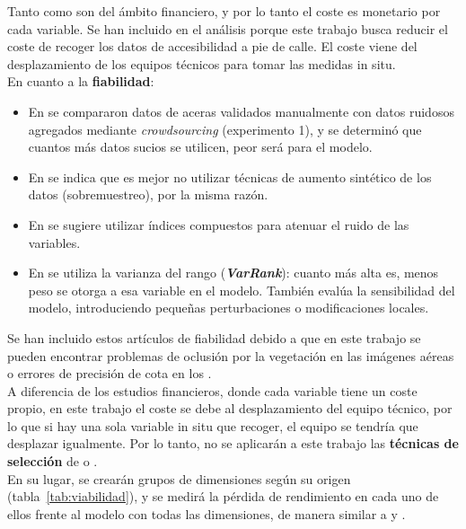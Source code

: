 Tanto \textcite{chen2024cost} como \textcite{liu2024haff} son del ámbito financiero, y por lo tanto el coste es monetario por cada variable. Se han incluido en el análisis porque este trabajo busca reducir el coste de recoger los datos de accesibilidad a pie de calle. El coste viene del desplazamiento de los equipos técnicos para tomar las medidas in situ.
\\

\noindent En cuanto a la \textbf{fiabilidad}:
\begin{itemize}
  \item En \textcite{duan2022} se compararon datos de aceras validados manualmente con datos ruidosos agregados mediante \textit{crowdsourcing} (experimento 1), y se determinó que cuantos más datos sucios se utilicen, peor será para el modelo.
  \item En \textcite{wang2026} se indica que es mejor no utilizar técnicas de aumento sintético de los datos (sobremuestreo), por la misma razón.
  \item En \textcite{agal2026} se sugiere utilizar índices compuestos para atenuar el ruido de las variables.
  \item En \textcite{knights2026} se utiliza la varianza del rango (\textbf{\textit{VarRank}}): cuanto más alta es, menos peso se otorga a esa variable en el modelo. También evalúa la sensibilidad del modelo, introduciendo pequeñas perturbaciones o modificaciones locales.
\end{itemize}

Se han incluido estos artículos de fiabilidad debido a que en este trabajo se pueden encontrar problemas de oclusión por la vegetación en las imágenes aéreas o errores de precisión de cota en los .
\\

A diferencia de los estudios financieros, donde cada variable tiene un coste propio, en este trabajo el coste se debe al desplazamiento del equipo técnico, por lo que si hay una sola variable in situ que recoger, el equipo se tendría que desplazar igualmente. Por lo tanto, no se aplicarán a este trabajo las \textbf{técnicas de selección} de \textcite{chen2024cost} o \textcite{liu2024haff}.
\\

En su lugar, se crearán grupos de dimensiones según su origen (tabla~\ref{tab:viabilidad}), y se medirá la pérdida de rendimiento en cada uno de ellos frente al modelo con todas las dimensiones, de manera similar a \textcite{mohite2024} y \textcite{wu2026}.
\\

